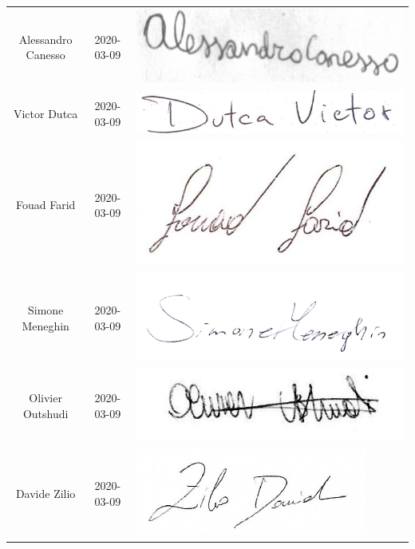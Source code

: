 \begin{table}[H]
\begin{center}
\begin{tabular}{ c c C{6cm}}
		Alessandro Canesso & 2020-03-09 & \includegraphics[scale=0.3]{img/firme/canesso.png}\\
		Victor Dutca & 2020-03-09 & \includegraphics[scale=0.2]{img/firme/dutca.png}\\
		Fouad Farid & 2020-03-09 & \includegraphics[scale=0.2]{img/firme/farid.png}\\
		Simone Meneghin & 2020-03-09 & \includegraphics[scale=0.10]{img/firme/meneghin.png}\\
		Olivier Outshudi & 2020-03-09 & \includegraphics[scale=0.3]{img/firme/outshudi.png}\\
		Davide Zilio & 2020-03-09 & \includegraphics[scale=0.4]{img/firme/zilio.png}\\
	\end{tabular}
	\end{center}
\end{table}

